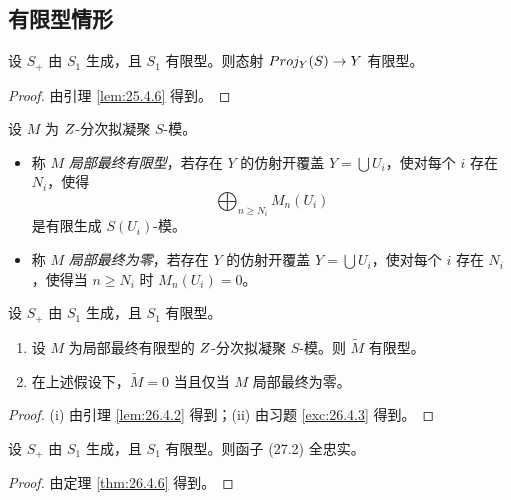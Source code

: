 \subsection{有限型情形}\label{sec:27.3}

\begin{corollary}\label{cor:27.3.1}
设 $S_+$ 由 $S_1$ 生成，且 $S_1$ 有限型。则态射 $Proj_Y(S) \to Y$ 有限型。
\end{corollary}

\begin{proof}
由引理 \ref{lem:25.4.6} 得到。
\end{proof}

\begin{definition}\label{def:27.3.2}
设 $M$ 为 $Z$-分次拟凝聚 $S$-模。
\begin{itemize}[leftmargin=2em,itemsep=0.25ex]
  \item 称 $M$ \emph{局部最终有限型}，若存在 $Y$ 的仿射开覆盖 $Y = \bigcup U_i$，使对每个 $i$ 存在 $N_i$，使得
  \[
  \bigoplus_{n \ge N_i} M_n(U_i)
  \]
  是有限生成 $S(U_i)$-模。
  \item 称 $M$ \emph{局部最终为零}，若存在 $Y$ 的仿射开覆盖 $Y = \bigcup U_i$，使对每个 $i$ 存在 $N_i$，使得当 $n \ge N_i$ 时 $M_n(U_i) = 0$。
\end{itemize}
\end{definition}

\begin{corollary}\label{cor:27.3.3}
设 $S_+$ 由 $S_1$ 生成，且 $S_1$ 有限型。
\begin{enumerate}[label=(\roman*),leftmargin=2.6em,itemsep=0.25ex]
  \item 设 $M$ 为局部最终有限型的 $Z$-分次拟凝聚 $S$-模。则 $\widetilde{M}$ 有限型。
  \item 在上述假设下，$\widetilde{M} = 0$ 当且仅当 $M$ 局部最终为零。
\end{enumerate}
\end{corollary}

\begin{proof}
(i) 由引理 \ref{lem:26.4.2} 得到；(ii) 由习题 \ref{exc:26.4.3} 得到。
\end{proof}

\begin{corollary}\label{cor:27.3.4}
设 $S_+$ 由 $S_1$ 生成，且 $S_1$ 有限型。则函子 (27.2) 全忠实。
\end{corollary}

\begin{proof}
由定理 \ref{thm:26.4.6} 得到。
\end{proof}

